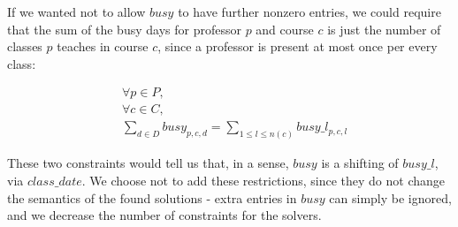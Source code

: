 If we wanted not to allow $busy$ to have further nonzero entries, we could require that the sum of the busy days for professor $p$ and course $c$ is just the number of classes $p$ teaches in course $c$, since a professor is present at most once per every class:

\begin{align}
  &\forall p \in P,\\
  &\forall c \in C,\\
  &\sum_{d \in D} busy_{p, c, d} = \sum_{1 \le l \le n(c)} busy\_l_{p, c, l}
\end{align}

These two constraints would tell us that, in a sense, $busy$ is a shifting of $busy\_l$, via $class\_date$. We choose not to add these restrictions, since they do not change the semantics of the found solutions - extra entries in $busy$ can simply be ignored, and we decrease the number of constraints for the solvers.
